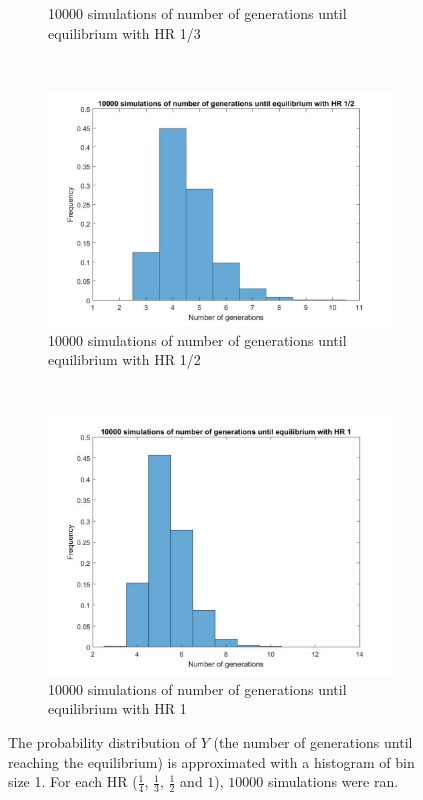 \begin{figure}[H]
\begin{subfigure}{0.45\textwidth}
        \caption{10000 simulations of number of generations until equilibrium with HR 1/3}
        \label{hist hap 1/3}
    \end{subfigure}
	~
    \begin{subfigure}{0.45\textwidth}
        \includegraphics[width=\textwidth]{GenormHistogramAantalgen2.pdf}
        \caption{10000 simulations of number of generations until equilibrium with HR 1/2}
        \label{hist hap 1/2}
    \end{subfigure}
    ~
    \begin{subfigure}{0.45\textwidth}
        \includegraphics[width=\textwidth]{GenormHistogramAantalgen1.pdf}
        \caption{10000 simulations of number of generations until equilibrium with HR 1}
        \label{hist hap 1}
    \end{subfigure}
    \caption{The probability distribution of $Y$ (the number of generations until reaching the equilibrium) is approximated with a histogram of bin size 1. 
    For each HR ($\frac{1}{4}$, $\frac{1}{3}$, $\frac{1}{2}$ and $1$), $10000$ simulations were ran.}
    \label{fig:histogram}
\end{figure}


